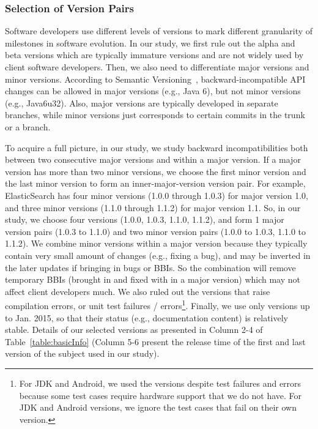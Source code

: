\subsubsection{Selection of Version Pairs}
Software developers use different levels of versions to mark different granularity of milestones in software evolution. In our study, we first rule out the alpha and beta versions which are typically immature versions and are not widely used by client software developers. Then, we also need to differentiate major versions and minor versions. According to Semantic Versioning~\cite{SemVer}\cite{SCAM2014}, backward-incompatible API changes can be allowed in major versions (e.g., Java 6), but not minor versions (e.g., Java6u32). Also, major versions are typically developed in separate branches, while minor versions just corresponds to certain commits in the trunk or a branch. 

To acquire a full picture, in our study, we study backward incompatibilities both between two consecutive major versions and within a major version. If a major version has more than two minor versions, we choose the first minor version and the last minor version to form an inner-major-version version pair. For example, ElasticSearch has four minor versions (1.0.0 through 1.0.3) for major version 1.0, and three minor versions (1.1.0 through 1.1.2) for major version 1.1. So, in our study, we choose four versions (1.0.0, 1.0.3, 1.1.0, 1.1.2), and form 1 major version pairs (1.0.3 to 1.1.0) and two minor version pairs (1.0.0 to 1.0.3, 1.1.0 to 1.1.2). We combine minor versions within a major version because they typically contain very small amount of changes (e.g., fixing a bug), and may be inverted in the later updates if bringing in bugs or BBIs. So the combination will remove temporary BBIs (brought in and fixed with in a major version) which may not affect client developers much. We also ruled out the versions that raise compilation errors, or unit test failures / errors\footnote{For JDK and Android, we used the versions despite test failures and errors because some test cases require hardware support that we do not have. For JDK and Android versions, we ignore the test cases that fail on their own version.}. Finally, we use only versions up to Jan. 2015, so that their status  (e.g., documentation content) is relatively stable. Details of our selected versions as presented in Column 2-4 of Table~\ref{table:basicInfo} (Column 5-6 present the release time of the first and last version of the subject used in our study).

